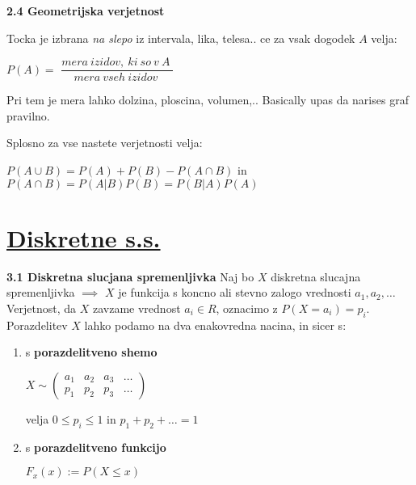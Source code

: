 \documentclass{article}
\begin{document}
\begin{multicols}{2}
\textbf{2.4 Geometrijska verjetnost}


Tocka je izbrana \textit{na slepo} iz intervala, lika, telesa.. ce za
vsak dogodek $A$ velja:
\begin{center}
    \begin{math}
        P(A) =
    \end{math}
    \smallskip
    \begin{math}
       \dfrac{
        mera\: izidov,\: ki\: so\: v\: A\:
        }
       {mera\: vseh\: izidov\:}
    \end{math}
\end{center}
Pri tem je mera lahko dolzina, ploscina, volumen,..
Basically upas da narises graf pravilno.

Splosno za vse nastete verjetnosti velja:
\begin{center}
    \begin{math}
    P(A \cup B) = P(A) + P(B) - P(A \cap B)
    \end{math} in 
    \begin{math}
        P(A \cap B) = P(A | B) P(B) = P(B | A) P(A)
    \end{math}
\end{center}

\section{\underline{Diskretne s.s.}}

\textbf{3.1 Diskretna slucjana spremenljivka}
Naj bo $X$ diskretna slucajna spremenljivka $\implies$ $X$ je funkcija
s koncno ali stevno zalogo  vrednosti ${ a_{1}, a_{2}, \dots}$ Verjetnost, 
da $X$ zavzame vrednost $a_{i} \in R$, oznacimo z $P(X = a_{i}) = p_{i}$. Porazdelitev
$X$ lahko podamo na dva enakovredna nacina, in sicer s:
\begin{enumerate}
    \item s \textbf{porazdelitveno shemo}
        \begin{center}
            \begin{math}
                X \sim
                \begin{pmatrix}
                    a_{1} & a_{2} & a_{3} & \dots \\
                    p_{1} & p_{2} & p_{3} & \dots
                \end{pmatrix}
            \end{math}
        \end{center}
        velja $0 \leq p_{i} \leq 1$ in $p_{1} + p_{2} + \dots = 1$
    \item s \textbf{porazdelitveno funkcijo}
        \begin{center}
            \begin{math}
                F_{x}(x) := P(X \leq x)
            \end{math}
        \end{center}
\end{enumerate}


\end{multicols}
\end{document}

